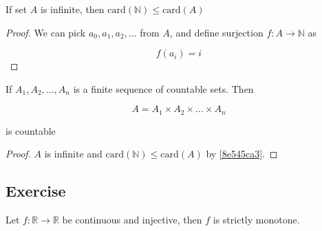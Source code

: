 \begin{thm}\label{8e545ca3}
    If set $A$ is infinite, then $\mathrm{card}(\mathbb{N}) \le \mathrm{card}(A)$
\end{thm}

\begin{proof}
    We can pick $a_0,a_1,a_2,\dots$ from $A$, and define surjection $f: A \to \mathbb{N}$ as

    \[
        f(a_i) = i
    \]
\end{proof}

\begin{thm}
    If $A_1,A_2,\dots, A_n$ is a finite sequence of countable sets. Then

    \[
        A = A_1 \times A_2 \times \dots \times A_n
    \]

    is countable
\end{thm}

\begin{proof}
    $A$ is infinite and $\mathrm{card}(\mathbb{N}) \le \mathrm{card}(A)$ by \cref{8e545ca3}.
\end{proof}

\subsection{Exercise}

\begin{exercise}
    Let $f: \mathbb{R} \to \mathbb{R}$ be continuous and injective, then $f$ is strictly monotone.
\end{exercise}

